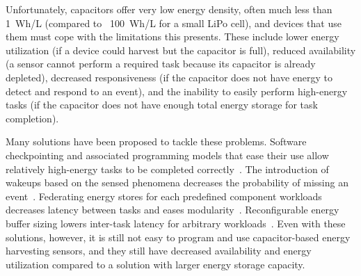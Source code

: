 

Unfortunately, capacitors offer very low energy density, often much less than 1~Wh/L (compared to ~100~Wh/L for a small LiPo cell), and devices that use
them must cope with the limitations this presents. These include lower energy
utilization (if a device could harvest but the capacitor is full), reduced
availability (a sensor cannot perform a required task because its capacitor is already depleted), decreased responsiveness
(if the capacitor does not have energy to detect and respond to an event), and the inability
to easily perform high-energy tasks (if the capacitor does not have enough total
energy storage for task completion).

Many solutions have been proposed to tackle
these problems. Software checkpointing and associated programming models
that ease their use allow relatively high-energy tasks to be completed
correctly~\cite{luciaIntermittent17}. The introduction of wakeups based on the
sensed phenomena decreases the probability of missing an
event~\cite{campbellEnergy14}. Federating
energy stores for each predefined component workloads decreases latency between
tasks and eases modularity~\cite{hesterTragedy15}. Reconfigurable energy
buffer sizing lowers inter-task latency for arbitrary workloads~\cite{colinReconfigurable18}.
Even with these solutions, however, it is still not easy to program and
use capacitor-based energy harvesting sensors, and they still have decreased
availability and energy utilization compared to a solution with larger
energy storage capacity.


